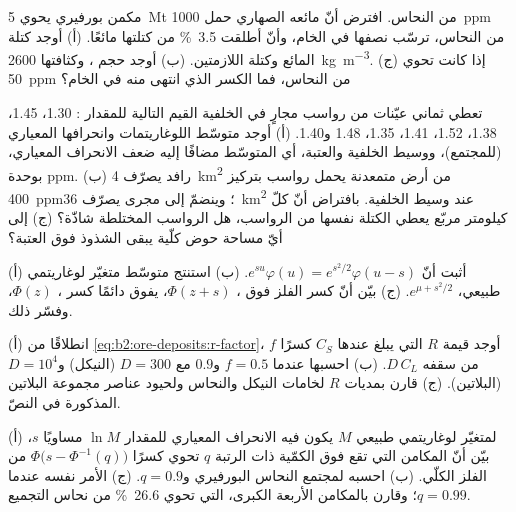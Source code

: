 \begin{exercise}[$\star\star$]\label{exo:b2:ore-deposits:8}
مكمن بورفيري يحوي \qty{5}{Mt} من النحاس. افترض أنّ مائعه الصهاري حمل \qty{1000}{ppm}
من النحاس، ترسّب نصفها في الخام، وأنّ  أطلقت \qty{3.5}{\percent}
من كتلتها مائعًا. (أ) أوجد كتلة المائع وكتلة  اللازمتين. (ب) أوجد حجم
، وكثافتها \qty{2600}{kg.m^{-3}}. (ج) إذا كانت  تحوي \qty{50}{ppm} من النحاس، فما الكسر
الذي انتهى منه في الخام؟
\end{exercise}

\begin{exercise}[$\star\star$]\label{exo:b2:ore-deposits:9}
تعطي ثماني عيّنات من رواسب مجارٍ في الخلفية القيم التالية للمقدار : 1.30، 1.45، 1.38، 1.52، 1.41، 1.35،
1.48 و1.40. (أ) أوجد متوسّط اللوغاريتمات وانحرافها المعياري (للمجتمع)، ووسيط
الخلفية والعتبة، أي المتوسّط مضافًا إليه ضعف الانحراف المعياري، بوحدة ppm. (ب) رافد
يصرّف \qty{4}{km^2} من أرض متمعدنة يحمل رواسب بتركيز \qty{400}{ppm}؛ وينضمّ إلى مجرى
يصرّف \qty{36}{km^2} عند وسيط الخلفية. بافتراض أنّ كلّ كيلومتر مربّع يعطي الكتلة نفسها
من الرواسب، هل الرواسب المختلطة شاذّة؟ (ج) إلى أيّ مساحة حوض كلّية يبقى
الشذوذ فوق العتبة؟
\end{exercise}

\begin{exercise}[$\star\star\star$]\label{exo:b2:ore-deposits:10}
(أ) أثبت أنّ $e^{su}\varphi(u) = e^{s^2/2}\varphi(u - s)$. (ب) استنتج متوسّط متغيّر لوغاريتمي
طبيعي، $e^{\mu + s^2/2}$. (ج) بيّن أنّ كسر الفلز فوق ،
$\Phi(z + s)$، يفوق دائمًا كسر ، $\Phi(z)$، وفسّر ذلك.
\end{exercise}

\begin{exercise}[$\star\star\star$]\label{exo:b2:ore-deposits:11}
(أ) انطلاقًا من \eqref{eq:b2:ore-deposits:r-factor}، أوجد قيمة $R$ التي يبلغ عندها $C_S$ كسرًا $f$
من سقفه $D\,C_L$. (ب) احسبها عندما $f = 0.5$ و$0.9$ مع $D = 300$ (النيكل) و$D =
10^4$ (البلاتين). (ج) قارن بمديات $R$ لخامات النيكل والنحاس ولحيود عناصر مجموعة البلاتين المذكورة
في النصّ.
\end{exercise}

\begin{exercise}[$\star\star\star$]\label{exo:b2:ore-deposits:12}
(أ) لمتغيّر لوغاريتمي طبيعي $M$ يكون فيه الانحراف المعياري للمقدار $\ln M$ مساويًا $s$، بيّن أنّ المكامن التي تقع
فوق الكمّية ذات الرتبة $q$ تحوي كسرًا $\Phi\bigl(s - \Phi^{-1}(q)\bigr)$ من الفلز الكلّي.
(ب) احسبه لمجتمع النحاس البورفيري و$q = 0.9$. (ج) الأمر نفسه عندما $q = 0.99$؛ وقارن
بالمكامن الأربعة الكبرى، التي تحوي \qty{26.6}{\percent} من نحاس التجميع.
\end{exercise}

